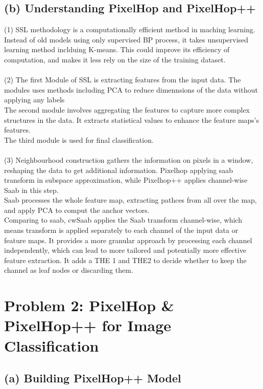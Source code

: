 \documentclass[12pt]{article}
\begin{document}
\subsection*{(b) Understanding PixelHop and PixelHop++}
	(1) SSL methodology is a computationally efficient method in maching learning. Instead of old models using only supervised BP process, it takes unsupervised learning method inclduing K-means. This could improve its efficiency of computation, and makes it less rely on the size of the training dataset. 
	\\\\
	(2) The first Module of SSL is extracting features from the input data. The modules uses methods including PCA to reduce dimennsions of the data without applying any labels\\
	The second module involves aggregating the features to capture more complex structures in the data. It extracts statistical values to enhance the feature maps's features.\\
	The third module is used for final classification. \\\\
	(3) Neighbourhood construction gathers the information on pixels in a window, reshaping the data to get additional information. Pixelhop applying saab transform in subspace approximation, while Pixelhop++ applies channel-wise Saab in this step.\\
	Saab processes the whole feature map, extracting pathces from all over the map, and apply PCA to comput the anchor vectors.\\
	 Comparing to saab, cwSaab applies the Saab transform channel-wise, which means transform is applied separately to each channel of the input data or feature maps. It provides a more granular approach by processing each channel independently, which can lead to more tailored and potentially more effective feature extraction. It adds a THE 1 and THE2 to decide whether to keep the channel as leaf nodes or discarding them. 
	\section*{Problem 2: PixelHop \& PixelHop++ for Image Classification}
	 \subsection*{(a) Building PixelHop++ Model}
\end{document}
